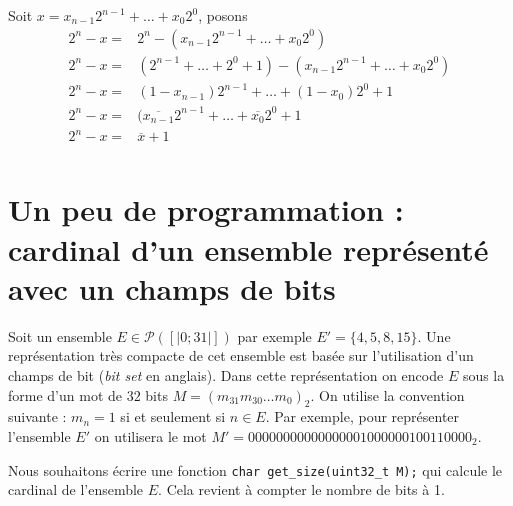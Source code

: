 \documentclass[a4paper,10pt]{exam}
\begin{document}
\begin{enumerate}
  \begin{solution}

Soit $x = x_{n-1}2^{n-1} + \dots + x_{0}2^{0}$, posons
\begin{align*}
2^n - x =& 2^n -  (x_{n-1}2^{n-1} + \dots + x_{0}2^{0})\\
2^n - x =& (2^{n-1} + \dots + 2^{0} +1)  - (x_{n-1}2^{n-1}+\dots +x_{0}2^{0})\\
2^n - x =& (1-x_{n-1})2^{n-1} + \dots + (1-x_{0})2^{0} +1\\
2^n - x =& (\overline{x_{n-1}}2^{n-1} + \dots + \overline{x_{0}}2^{0} +1\\
2^n - x =& \overline{x} + 1\\
\end{align*}

  \end{solution}

  \end{enumerate}

\section{Un peu de programmation : cardinal d'un ensemble représenté avec un
  champs de bits}

Soit un ensemble $E \in \mathcal{P}([|0;31|])$ par exemple $E' = \{4,5,8,15\}$.
Une représentation très compacte de cet ensemble est basée sur l'utilisation
d'un champs de bit (\emph{bit set} en anglais). Dans cette représentation on
encode $E$ sous la forme d'un mot de $32$ bits $M=(m_{31}m_{30}\dots m_{0})_2$.
On utilise la convention suivante : $m_n = 1$ si et seulement si $n
\in E$.  Par exemple, pour représenter l'ensemble $E'$ on utilisera le mot $M'=
00000000000000001000000100110000_2$.

Nous souhaitons écrire une fonction \texttt{char get\_size(uint32\_t M);} qui
calcule le cardinal de l'ensemble $E$. Cela revient à compter le nombre de bits
à 1.
\end{document}
